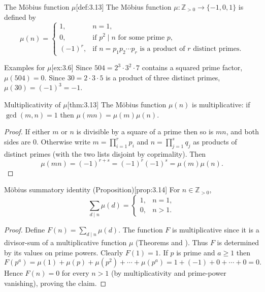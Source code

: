 \documentclass[10pt]{article}
\theoremstyle{definition}
\theoremstyle{plain}
\numberwithin{equation}{section}
\begin{document}
\begin{define}{The Möbius function $\mu$}[def:3.13]
The Möbius function $\mu:\mathbb{Z}_{>0}\to\{-1,0,1\}$ is defined by
\[
\mu(n)=
\begin{cases}
1,& n=1,\\[4pt]
0,&\text{if } p^2\mid n \text{ for some prime } p,\\[4pt]
(-1)^r,&\text{if } n=p_1p_2\cdots p_r \text{ is a product of } r \text{ distinct primes.}
\end{cases}
\]
\end{define}

\begin{define}{Examples for $\mu$}[ex:3.6]
Since $504=2^3\cdot 3^2\cdot 7$ contains a squared prime factor, $\mu(504)=0$.  
Since $30=2\cdot 3\cdot 5$ is a product of three distinct primes, $\mu(30)=(-1)^3=-1$.
\end{define}

\begin{define}{Multiplicativity of $\mu$}[thm:3.13]
The Möbius function $\mu(n)$ is multiplicative: if $\gcd(m,n)=1$ then $\mu(mn)=\mu(m)\mu(n)$.
\end{define}

\begin{proof}
If either $m$ or $n$ is divisible by a square of a prime then so is $mn$, and both sides are $0$. Otherwise write $m=\prod_{i=1}^r p_i$ and $n=\prod_{j=1}^s q_j$ as products of distinct primes (with the two lists disjoint by coprimality). Then
\[
\mu(mn)=(-1)^{r+s}=(-1)^r(-1)^s=\mu(m)\mu(n).
\]
\end{proof}

\begin{define}{Möbius summatory identity (Proposition)}[prop:3.14]
For $n\in\mathbb{Z}_{>0}$,
\[
\sum_{d\mid n}\mu(d)=
\begin{cases}
1,& n=1,\\[4pt]
0,& n>1.
\end{cases}
\]
\end{define}

\begin{proof}
Define $F(n)=\sum_{d\mid n}\mu(d)$. The function $F$ is multiplicative since it is a divisor-sum of a multiplicative function $\mu$ (Theorems  and ). Thus $F$ is determined by its values on prime powers. Clearly $F(1)=1$. If $p$ is prime and $a\ge1$ then
\[
F(p^a)=\mu(1)+\mu(p)+\mu(p^2)+\cdots+\mu(p^a)=1+(-1)+0+\cdots+0=0.
\]
Hence $F(n)=0$ for every $n>1$ (by multiplicativity and prime-power vanishing), proving the claim.
\end{proof}
\end{document}
